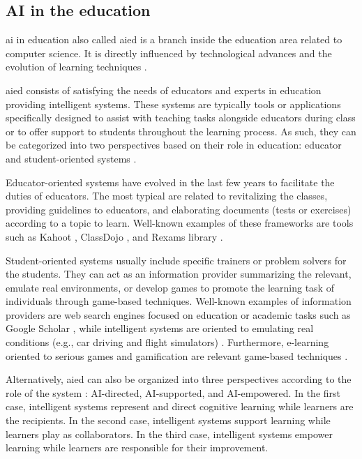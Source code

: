 \documentclass[pdflatex,sn-mathphys-num]{sn-jnl}%
\begin{document}
\subsection{AI in the education}
\label{sec:ai}
\ac{ai} in education also called \ac{aied} is a branch inside the education area related to computer science. It is directly influenced by technological advances and the evolution of learning techniques \cite{chen2020artificial}. 

\ac{aied} consists of satisfying the needs of educators and experts in education providing intelligent systems. These systems are typically tools or applications specifically designed to assist with teaching tasks alongside educators during class or to offer support to students throughout the learning process. As such, they can be categorized into two perspectives based on their role in education: educator and student-oriented systems \cite{chen2022two}.

Educator-oriented systems have evolved in the last few years to facilitate the duties of educators. The most typical are related to revitalizing the classes, providing guidelines to educators, and elaborating documents (tests or exercises) according to a topic to learn. Well-known examples of these frameworks are tools such as Kahoot \cite{medina2017kahoot}, ClassDojo \cite{digiacomo2021students}, and Rexams library \cite{grun2009automatic}.

Student-oriented systems usually include specific trainers or problem solvers for the students. They can act as an information provider summarizing the relevant, emulate real environments, or develop games to promote the learning task of individuals through game-based techniques. Well-known examples of information providers are web search engines focused on education or academic tasks such as Google Scholar \cite{jacso2008google}, while intelligent systems are oriented to emulating real conditions (e.g., car driving and flight simulators) \cite{de2013analysis}. Furthermore, e-learning oriented to serious games and gamification are relevant game-based techniques \cite{tolks2024role}.

Alternatively, \ac{aied} can also be organized into three perspectives according to the role of the system \cite{ouyang2021artificial}: AI-directed, AI-supported, and AI-empowered. In the first case, intelligent systems represent and direct cognitive learning while learners are the recipients. In the second case, intelligent systems support learning while learners play as collaborators. In the third case, intelligent systems empower learning while learners are responsible for their improvement.
\end{document}
